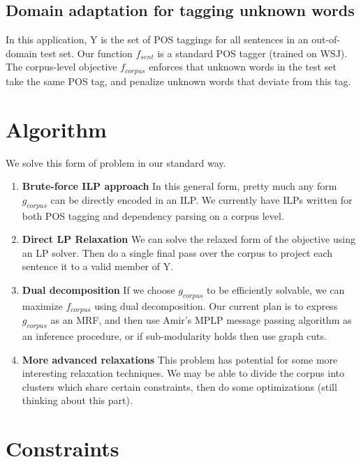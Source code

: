 \documentclass{article}
\begin{document}
\subsection{Domain adaptation for tagging unknown words}

In this application, Y is the set of POS taggings for all sentences in
an out-of-domain test set. Our function $f_{sent}$ is a standard POS
tagger (trained on WSJ). The corpus-level objective $f_{corpus}$
enforces that unknown words in the test set take the same POS tag, and
penalize unknown words that deviate from this tag.

\section{Algorithm}

We solve this form of problem in our standard way. 

\begin{enumerate}
\item \textbf{Brute-force ILP approach}  In this general form, pretty
much any form  $g_{corpus}$ can be directly encoded in an ILP. We currently 
have ILPs written for both POS tagging and dependency parsing on a corpus level.

\item \textbf{ Direct LP Relaxation} We can solve the relaxed form of the objective using
an LP solver. Then do a single final pass over the corpus to project each sentence it to a valid
member of Y.
 
\item \textbf{Dual decomposition} If we choose $g_{corpus}$ to be efficiently
solvable, we can maximize $f_{corpus}$ using dual decomposition. Our current plan is to express
$g_{corpus}$ as an MRF, and then use Amir's MPLP message passing algorithm
as an inference procedure, or if sub-modularity holds then 
use graph cuts. 

\item \textbf{More advanced relaxations} This problem has potential for some more
interesting relaxation techniques. We may be able to divide the corpus
into clusters which share certain constraints, then do some optimizations (still thinking about this part).

\end{enumerate}

\section{Constraints}
\end{document}
